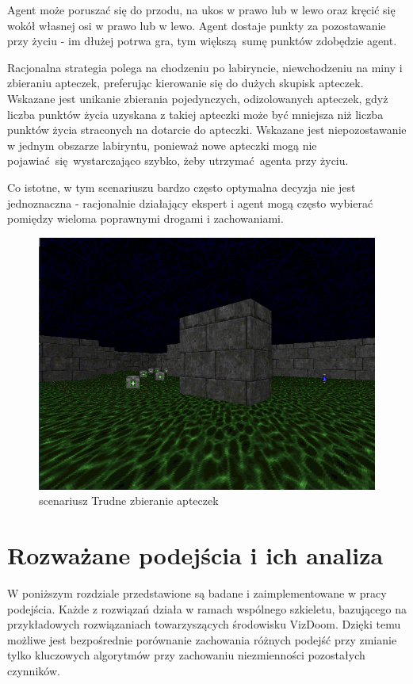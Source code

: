 \documentclass[polish,master,a4paper,oneside]{ppfcmthesis}
\begin{document}
Agent może poruszać się do przodu, na ukos w prawo lub w lewo oraz kręcić się wokół własnej osi w prawo lub w lewo. Agent dostaje punkty za pozostawanie przy życiu - im dłużej potrwa gra, tym większą sumę punktów zdobędzie agent.

Racjonalna strategia polega na chodzeniu po labiryncie, niewchodzeniu na miny i zbieraniu apteczek, preferując kierowanie się do dużych skupisk apteczek. Wskazane jest unikanie zbierania pojedynczych, odizolowanych apteczek, gdyż liczba punktów życia uzyskana z takiej apteczki może być mniejsza niż liczba punktów życia straconych na dotarcie do apteczki. Wskazane jest niepozostawanie w jednym obszarze labiryntu, ponieważ nowe apteczki mogą nie pojawiać się wystarczająco szybko, żeby utrzymać agenta przy życiu.

Co istotne, w tym scenariuszu bardzo często optymalna decyzja nie jest jednoznaczna - racjonalnie działający ekspert i agent mogą często wybierać pomiędzy wieloma poprawnymi drogami i zachowaniami.
\begin{center}
\begin{figure}[H]
\includegraphics[scale = 0.4]{figures/screens/scenarios/hgs.png}{\caption{scenariusz Trudne zbieranie apteczek}\label{fig:scenario_hgs}}
\end{figure}
\end{center}
  \chapter{Rozważane podejścia i ich analiza}
W poniższym rozdziale przedstawione są badane i zaimplementowane w pracy podejścia. Każde z rozwiązań działa w ramach wspólnego szkieletu, bazującego na przykładowych rozwiązaniach towarzyszących środowisku VizDoom. Dzięki temu możliwe jest bezpośrednie porównanie zachowania różnych podejść przy zmianie tylko kluczowych algorytmów przy zachowaniu niezmienności pozostałych czynników.
\end{document}
